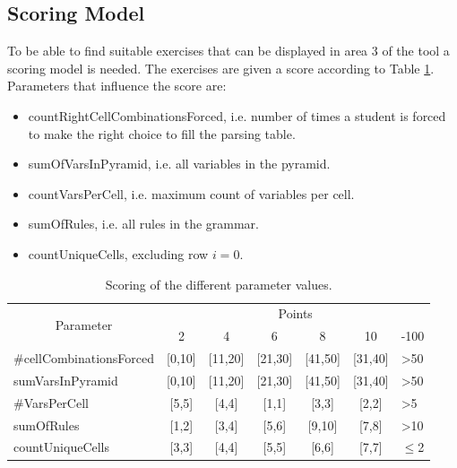 \clearpage

\subsection{Scoring Model} \label{scoringModel}
To be able to find suitable exercises that can be displayed in area 3 of the tool a scoring model is needed. The exercises are given a score according to Table \ref{scoring}. Parameters that influence the score are:
\begin{itemize}
	\item countRightCellCombinationsForced, i.e. number of times a student is forced to make the right choice to fill the parsing table.
	\item sumOfVarsInPyramid, i.e. all variables in the pyramid.
	\item countVarsPerCell, i.e. maximum count of variables per cell.
	\item sumOfRules, i.e. all rules in the grammar.
	\item countUniqueCells, excluding row $i=0$. 
\end{itemize}
\begin{table}[H]
	\centering
	\begin{tabular}{|l|c|c|c|c|c|l|}
		\hline
		\multicolumn{1}{|c|}{\multirow{2}{*}{Parameter}} & \multicolumn{6}{c|}{Points}                                                          \\ \cline{2-7} 
		\multicolumn{1}{|c|}{}		& 2          & 4           & 6           & 8           & 10          & -100            \\ \hline
		\#cellCombinationsForced      & {[}0,10{]} & {[}11,20{]} & {[}21,30{]} & {[}41,50{]} & {[}31,40{]} & \textgreater 50 \\ \hline
		sumVarsInPyramid            & {[}0,10{]} & {[}11,20{]} & {[}21,30{]} & {[}41,50{]} & {[}31,40{]} & \textgreater 50 \\ \hline
		\#VarsPerCell              & {[}5,5{]}  & {[}4,4{]}   & {[}1,1{]}   & {[}3,3{]}   & {[}2,2{]}   & \textgreater 5  \\ \hline
		sumOfRules              & {[}1,2{]}  & {[}3,4{]}   & {[}5,6{]}   & {[}9,10{]}  & {[}7,8{]}   & \textgreater 10 \\ \hline		countUniqueCells & {[}3,3{]}  & {[}4,4{]}   & {[}5,5{]}   & {[}6,6{]}  & {[}7,7{]}   & $\leq$2  \\ \hline
	\end{tabular}
	\caption{Scoring of the different parameter values.}
	\label{scoring}
\end{table}



